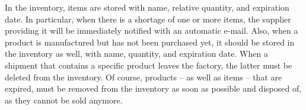 In the inventory, items are stored with name, relative quantity, and expiration date. In particular, when there is a shortage of one or more items, the supplier
providing it will be immediately notified with an automatic e-mail. Also, when a product is manufactured but has not been purchased yet, it should be stored in
the inventory as well, with name, quantity, and expiration date. When a shipment that contains a specific product leaves the factory, the latter must be deleted
from the inventory. Of course, products -- as well as items -- that are expired, must be removed from the inventory as soon as possible and disposed of, as they cannot be
sold anymore.

%
%
%
%
